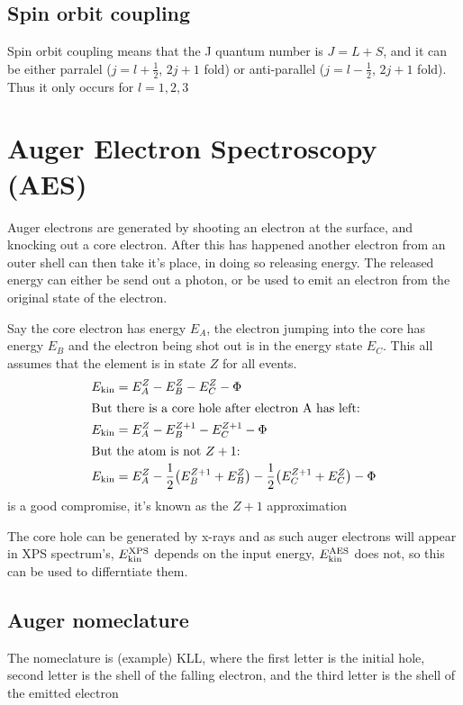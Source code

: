 \documentclass[article,oneside]{memoir}
\begin{document}
\section{Spin orbit coupling}
Spin orbit coupling means that the J quantum number is $J=L+S$, and it can be either parralel ($j=l+\frac{1}{2}$, $2j+1$ fold) or anti-parallel ($j=l-\frac{1}{2}$, $2j+1$ fold). Thus it only occurs for $l=1,2,3$


\chapter{Auger Electron Spectroscopy (AES)}

Auger electrons are generated by shooting an electron at the surface, and knocking out a core electron. After this has happened another electron from an outer shell can then take it's place, in doing so releasing energy. The released energy can either be send out a photon, or be used to emit an electron from the original state of the electron.

Say the core electron has energy $E_A$, the electron jumping into the core has energy $E_{B}$ and the electron being shot out is in the energy state $E_{C}$.
This all assumes that the element is in state $Z$ for all events. 
\begin{align*}
        E_{\textup{kin}}&=E_{A}^{Z}-E_{B}^{Z}-E_{C}^{Z}-\Phi\\
        \intertext{But there is a core hole after electron A has left:}
        E_{\textup{kin}}&=E_{A}^{Z}-E_{B}^{Z+1}-E_{C}^{Z+1}-\Phi\\
        \intertext{But the atom is not $Z+1$:}
        E_{\textup{kin}}&=E_{A}^{Z}-\frac{1}{2}\big(E_{B}^{Z+1}+E_{B}^{Z}\big)-\frac{1}{2}\big(E_{C}^{Z+1}+E_{C}^{Z}\big)-\Phi
\end{align*}
is a good compromise, it's known as the $Z+1$ approximation

The core hole can be generated by x-rays and as such auger electrons will appear in XPS spectrum's, $E_{\textup{kin}}^{\textup{XPS}}$ depends on the input energy, $E_{\textup{kin}}^{\textup{AES}}$ does not, so this can be used to differntiate them.
\section{Auger nomeclature}
The nomeclature is (example) KLL, where the first letter is the initial hole, second letter is the shell of the falling electron, and the third letter is the shell of the emitted electron
\end{document}
